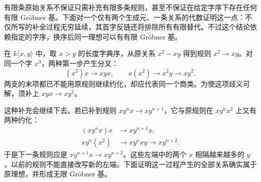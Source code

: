 有限条原始关系不保证只需补充有限多条规则，甚至不保证在给定字序下存在任何有限 Gröbner 基。下面对一个仅有两个生成元、一条关系的代数证明这一点：不仅所写的补全过程无穷延续，其首字反链还将排除所有有限替代。不过这个结论依赖指定的字序，换序后同一理想可以有有限 Gröbner 基。

\ProseParagraphBreak
在 \(k\langle x,y\rangle\) 中，取 \(x>y\) 的长度字典序，从原关系 \(x^2-xy\) 得到规则 \(x^2\to xy\)。对同一个字 \(x^3\)，两种第一步产生分叉：
\[
	(x^2)x\longrightarrow xyx, \qquad x(x^2)\longrightarrow x^2y\longrightarrow xy^2.
\]
两支的末项都已不能用原规则继续约化，却应代表同一个商类。为使这项歧义可解，须补上 \(xyx\to xy^2\)。

\ProseParagraphBreak
这种补充会继续下去。若已补到规则 \(xy^nx\to xy^{n+1}\)，它与原规则在 \(xy^nx^2\) 上又有两种约化：
\[
	\begin{aligned}
		(xy^nx)x&\longrightarrow xy^{n+1}x,\\
		xy^n(x^2)&\longrightarrow xy^nxy\longrightarrow xy^{n+2}.
	\end{aligned}
\]
于是下一条规则应是 \(xy^{n+1}x\to xy^{n+2}\)。这些左端中的两个 \(x\) 相隔越来越多的 \(y\)，以前的规则不能直接改写新的左端。下面证明这一过程产生的全部关系确实属于原理想，并形成无限 Gröbner 基。

